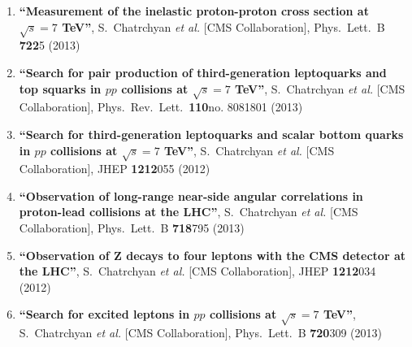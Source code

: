 \begin{enumerate}
\item%
{\bf ``Measurement of the inelastic proton-proton cross section at $\sqrt{s}=7$ TeV''}, 
  S.~Chatrchyan {\it et al.}  [CMS Collaboration], 
Phys.\ Lett.\ B {\bf 722}5 (2013) %


\item%
{\bf ``Search for pair production of third-generation leptoquarks and top squarks in $pp$ collisions at $\sqrt{s}=7$ TeV''}, 
  S.~Chatrchyan {\it et al.}  [CMS Collaboration], 
Phys.\ Rev.\ Lett.\  {\bf 110}no. 8081801 (2013) %


\item%
{\bf ``Search for third-generation leptoquarks and scalar bottom quarks in $pp$ collisions at $\sqrt{s}=7$ TeV''}, 
  S.~Chatrchyan {\it et al.}  [CMS Collaboration], 
JHEP {\bf 1212}055 (2012) %


\item%
{\bf ``Observation of long-range near-side angular correlations in proton-lead collisions at the LHC''}, 
  S.~Chatrchyan {\it et al.}  [CMS Collaboration], 
Phys.\ Lett.\ B {\bf 718}795 (2013) %


\item%
{\bf ``Observation of Z decays to four leptons with the CMS detector at the LHC''}, 
  S.~Chatrchyan {\it et al.}  [CMS Collaboration], 
JHEP {\bf 1212}034 (2012) %


\item%
{\bf ``Search for excited leptons in $pp$ collisions at $\sqrt{s}=7$ TeV''}, 
  S.~Chatrchyan {\it et al.}  [CMS Collaboration], 
Phys.\ Lett.\ B {\bf 720}309 (2013) %



\end{enumerate}
